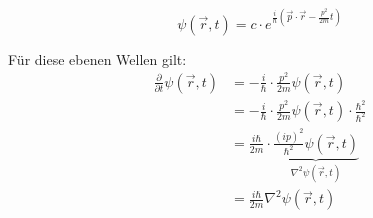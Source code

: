   \begin{equation}
   \label{eq:1}
    \psi(\vec{r},t)=c\cdot  e^{\frac{i}{\hbar}(\vec{p}\cdot\vec{r}-\frac{p^{2}}{2m}t)}
  \end{equation}

  Für diese ebenen Wellen gilt:
  \begin{align*}
   \frac{\partial}{\partial t}\psi(\vec{r},t) &=
      -\frac{i}{\hbar}\cdot\frac{p^{2}}{2m}\psi(\vec{r},t)\\
      &=-\frac{i}{\hbar}\cdot\frac{p^{2}}{2m}\psi(\vec{r},t)
      \cdot \frac{\hbar^2}{\hbar^2}\\
  &= \frac{i\hbar}{2m}\cdot  \underbrace{\frac{(ip)^2}{\hbar^2}\psi(\vec{r},t)}_{\nabla^2\psi(\vec{r},t)}\\
  &= \frac{i\hbar}{2m}\nabla^2\psi(\vec{r},t)
\end{align*}



